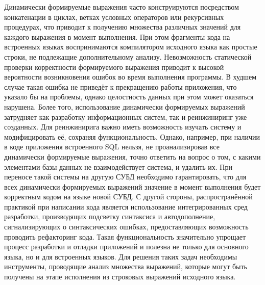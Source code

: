 Динамически формируемые выражения часто конструируются посредством конкатенации в циклах, ветках условных операторов или рекурсивных процедурах, что приводит к получению множества различных значений для каждого выражения в момент выполнения. При этом фрагменты кода на встроенных  языках воспринимаются компилятором исходного языка как простые строки, не подлежащие дополнительному анализу. Невозможность статической проверки корректности формируемого выражения приводит к высокой вероятности возникновения ошибок во время выполнения программы. В худшем случае такая ошибка не приведёт к прекращению работы приложения, что указало бы на проблемы, однако целостность данных при этом может оказаться нарушена. Более того, использование динамически формируемых выражений затрудняет как разработку информационных систем, так и реинжиниринг уже созданных. Для реинжинирига важно иметь возможность изучать систему и модифицировать её, сохраняя функциональность. Однако, например, при наличии в коде приложения встроенного SQL нельзя, не проанализировав все динамически формируемые выражения, точно ответить на вопрос о том, с какими элементами базы данных не взаимодействует система, и удалить их. При переносе такой системы на другую СУБД необходимо гарантировать, что для всех динамически формируемых выражений значение в момент выполнения будет корректным кодом на языке новой СУБД. С другой стороны, распространённой практикой при написании кода является использование интегрированных сред разработки, производящих подсветку синтаксиса и автодополнение, сигнализирующих о синтаксических ошибках, предоставляющих возможность проводить рефакторинг кода. Такая функциональность значительно упрощает процесс разработки и отладки приложений и полезна не только для основного языка, но и для встроенных языков. Для решения таких задач необходимы инструменты, проводящие анализ множества выражений, которые могут быть получены на этапе исполнения из строковых выражений исходного языка.


